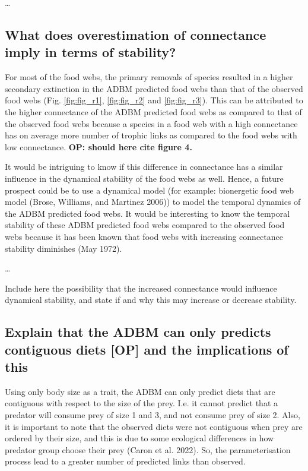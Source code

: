 \documentclass{article}
\begin{document}
\ldots{}

\hypertarget{what-does-overestimation-of-connectance-imply-in-terms-of-stability}{%
\subsection{What does overestimation of connectance imply in terms of
stability?}\label{what-does-overestimation-of-connectance-imply-in-terms-of-stability}}

For most of the food webs, the primary removals of species resulted in a
higher secondary extinction in the ADBM predicted food webs than that of
the observed food webs (Fig. \ref{fig:fig_r1}, \ref{fig:fig_r2} and
\ref{fig:fig_r3}). This can be attributed to the higher connectance of
the ADBM predicted food webs as compared to that of the observed food
webs because a species in a food web with a high connectance has on
average more number of trophic links as compared to the food webs with
low connectance. \textbf{OP: should here cite figure 4.}

It would be intriguing to know if this difference in connectance has a
similar influence in the dynamical stability of the food webs as well.
Hence, a future prospect could be to use a dynamical model (for example:
bionergetic food web model (Brose, Williams, and Martinez 2006)) to
model the temporal dynamics of the ADBM predicted food webs. It would be
interesting to know the temporal stability of these ADBM predicted food
webs compared to the observed food webs because it has been known that
food webs with increasing connectance stability diminishes (May 1972).

\ldots{}

Include here the possibility that the increased connectance would
influence dynamical stability, and state if and why this may increase or
decrease stability.

\hypertarget{explain-that-the-adbm-can-only-predicts-contiguous-diets-op-and-the-implications-of-this}{%
\subsection{Explain that the ADBM can only predicts contiguous diets
{[}OP{]} and the implications of
this}\label{explain-that-the-adbm-can-only-predicts-contiguous-diets-op-and-the-implications-of-this}}

Using only body size as a trait, the ADBM can only predict diets that
are contiguous with respect to the size of the prey. I.e. it cannot
predict that a predator will consume prey of size 1 and 3, and not
consume prey of size 2. Also, it is important to note that the observed
diets were not contiguous when prey are ordered by their size, and this
is due to some ecological differences in how predator group choose their
prey (Caron et al. 2022). So, the parameterisation process lead to a
greater number of predicted links than observed.
\end{document}
